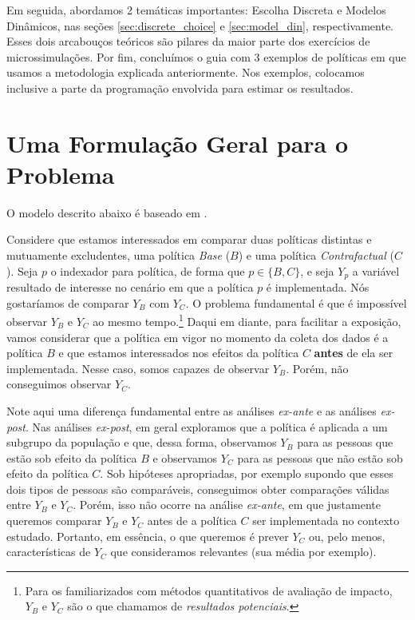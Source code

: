 \documentclass[12pt, a4paper, openany]{book}
\numberwithin{equation}{chapter}
\numberwithin{table}{chapter}
\numberwithin{figure}{chapter}
\theoremstyle{break}
\begin{document}
Em seguida, abordamos 2 temáticas importantes: Escolha Discreta e Modelos Dinâmicos, nas seções \ref{sec:discrete_choice} e \ref{sec:model_din}, respectivamente. Esses dois arcabouços teóricos são pilares da maior parte dos exercícios de microssimulações. Por fim, concluímos o guia com 3 exemplos de políticas em que usamos a metodologia explicada anteriormente. Nos exemplos, colocamos inclusive a parte da programação envolvida para estimar os resultados.


\section{Uma Formulação Geral para o Problema}
\label{sec:contrafactual_geral}

O modelo descrito abaixo é baseado em \textcite{figari2015}.

Considere que estamos interessados em comparar duas políticas distintas e mutuamente excludentes, uma política \textit{Base} ($B$) e uma política \textit{Contrafactual} ($C$). Seja $p$ o indexador para política, de forma que $p\in\{B, C\}$, e seja $Y_p$ a variável resultado de interesse no cenário em que a política $p$ é implementada. Nós gostaríamos de comparar $Y_B$ com $Y_C$. O problema fundamental é que é impossível observar $Y_B$ e $Y_C$ ao mesmo tempo.\footnote{Para os familiarizados com métodos quantitativos de avaliação de impacto, $Y_B$ e $Y_C$ são o que chamamos de \textit{resultados potenciais}.} Daqui em diante, para facilitar a exposição, vamos considerar que a política em vigor no momento da coleta dos dados é a política $B$ e que estamos interessados nos efeitos da política $C$ \textbf{antes} de ela ser implementada. Nesse caso, somos capazes de observar $Y_B$. Porém, não conseguimos observar $Y_C$. 

Note aqui uma diferença fundamental entre as análises \textit{ex-ante} e as análises \textit{ex-post}. Nas análises \textit{ex-post}, em geral exploramos que a política é aplicada a um subgrupo da população e que, dessa forma, observamos $Y_B$ para as pessoas que estão sob efeito da política $B$ e observamos $Y_C$ para as pessoas que não estão sob efeito da política $C$. Sob hipóteses apropriadas, por exemplo supondo que esses dois tipos de pessoas são comparáveis, conseguimos obter comparações válidas entre $Y_B$ e $Y_C$. Porém, isso não ocorre na análise \textit{ex-ante}, em que justamente queremos comparar $Y_B$ e $Y_C$ antes de a política $C$ ser implementada no contexto estudado. Portanto, em essência, o que queremos é prever $Y_C$ ou, pelo menos, características de $Y_C$ que consideramos relevantes (sua média por exemplo). 
\end{document}
